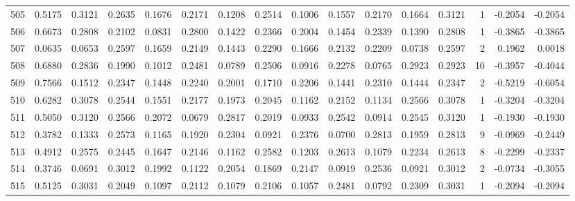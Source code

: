 \begin{tabular}{lrrrrrrrrrrrrrrr}
505 &      0.5175 &  0.3121 &  0.2635 &  0.1676 &  0.2171 &  0.1208 &  0.2514 &  0.1006 &  0.1557 &  0.2170 &   0.1664 &     0.3121 &      1 &                   -0.2054 &                    -0.2054 \\
506 &      0.6673 &  0.2808 &  0.2102 &  0.0831 &  0.2800 &  0.1422 &  0.2366 &  0.2004 &  0.1454 &  0.2339 &   0.1390 &     0.2808 &      1 &                   -0.3865 &                    -0.3865 \\
507 &      0.0635 &  0.0653 &  0.2597 &  0.1659 &  0.2149 &  0.1443 &  0.2290 &  0.1666 &  0.2132 &  0.2209 &   0.0738 &     0.2597 &      2 &                    0.1962 &                     0.0018 \\
508 &      0.6880 &  0.2836 &  0.1990 &  0.1012 &  0.2481 &  0.0789 &  0.2506 &  0.0916 &  0.2278 &  0.0765 &   0.2923 &     0.2923 &     10 &                   -0.3957 &                    -0.4044 \\
509 &      0.7566 &  0.1512 &  0.2347 &  0.1448 &  0.2240 &  0.2001 &  0.1710 &  0.2206 &  0.1441 &  0.2310 &   0.1444 &     0.2347 &      2 &                   -0.5219 &                    -0.6054 \\
510 &      0.6282 &  0.3078 &  0.2544 &  0.1551 &  0.2177 &  0.1973 &  0.2045 &  0.1162 &  0.2152 &  0.1134 &   0.2566 &     0.3078 &      1 &                   -0.3204 &                    -0.3204 \\
511 &      0.5050 &  0.3120 &  0.2566 &  0.2072 &  0.0679 &  0.2817 &  0.2019 &  0.0933 &  0.2542 &  0.0914 &   0.2545 &     0.3120 &      1 &                   -0.1930 &                    -0.1930 \\
512 &      0.3782 &  0.1333 &  0.2573 &  0.1165 &  0.1920 &  0.2304 &  0.0921 &  0.2376 &  0.0700 &  0.2813 &   0.1959 &     0.2813 &      9 &                   -0.0969 &                    -0.2449 \\
513 &      0.4912 &  0.2575 &  0.2445 &  0.1647 &  0.2146 &  0.1162 &  0.2582 &  0.1203 &  0.2613 &  0.1079 &   0.2234 &     0.2613 &      8 &                   -0.2299 &                    -0.2337 \\
514 &      0.3746 &  0.0691 &  0.3012 &  0.1992 &  0.1122 &  0.2054 &  0.1869 &  0.2147 &  0.0919 &  0.2536 &   0.0921 &     0.3012 &      2 &                   -0.0734 &                    -0.3055 \\
515 &      0.5125 &  0.3031 &  0.2049 &  0.1097 &  0.2112 &  0.1079 &  0.2106 &  0.1057 &  0.2481 &  0.0792 &   0.2309 &     0.3031 &      1 &                   -0.2094 &                    -0.2094 \\

\end{tabular}
